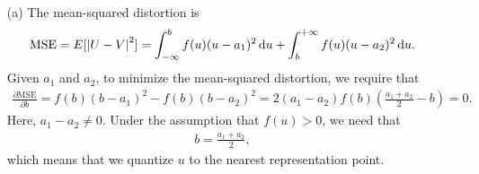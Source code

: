 \documentclass{assignment}
\begin{document}
\begin{sol}
    \begin{itemize}
        \item[(a)] The mean-squared distortion is
        \begin{align}
            \text{MSE}=E[\left\lvert U-V\right\rvert^2]=\int_{-\infty}^bf(u)(u-a_1)^2\,\mathrm{d}u+\int_b^{+\infty}f(u)(u-a_2)^2\,\mathrm{d}u.
        \end{align}
        Given $a_1$ and $a_2$, to minimize the mean-squared distortion, we require that
        \begin{align}
            \label{P-2-necessary-condition}
            \frac{\partial\text{MSE}}{\partial b}=f(b)(b-a_1)^2-f(b)(b-a_2)^2=2(a_1-a_2)f(b)\left(\frac{a_1+a_2}{2}-b\right)=0.
        \end{align}
        Here, $a_1-a_2\neq 0$. Under the assumption that $f(u)>0$, we need that
        \begin{align}
            b=\frac{a_1+a_2}{2},
        \end{align}
        which means that we quantize $u$ to the nearest representation point.


\end{itemize}
\end{sol}
\end{document}
